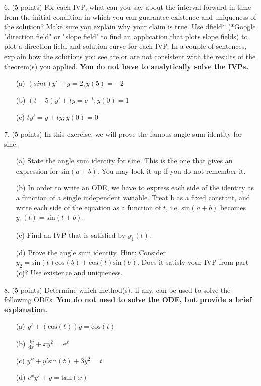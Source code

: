 \documentclass[12pt,letterpaper]{hmcpset}
\begin{document}
\begin{problem}
6. (5 points) For each IVP, what can you say about the interval forward in time from the initial
condition in which you can guarantee existence and uniqueness of the solution? Make sure
you explain why your claim is true. Use dfield* (*Google "direction field" or "slope field" to find an
application that plots slope fields)
to plot a direction field and solution curve for
each IVP. In a couple of sentences, explain how the solutions you see are or are not consistent
with the results of the theorem(s) you applied. \textbf{You do not have to analytically solve
the IVPs.}

\begin{enumerate}
    \item[(a)] $(sin t)y' + y = 2; y(5) = -2$
    \item[(b)]  $(t - 5)y' + ty = e^{-t}; y(0) = 1$
    \item[(c)] $ty' = y + ty; y(0) = 0$
\end{enumerate}
\end{problem}
\newpage

\begin{problem}
7. (5 points) In this exercise, we will prove the famous angle sum identity for sine.

\begin{enumerate}
    \item[(a)] State the angle sum identity for sine. This is the one that gives an expression for
$\text{sin}(a + b)$. You may look it up if you do not remember it.
    \item[(b)] In order to write an ODE, we have to express each side of the identity as a function of
a single independent variable. Treat b as a fixed constant, and write each side of the
equation as a function of $t$, i.e. sin$(a + b)$ becomes $y_1(t) = \text{sin}(t + b)$.
    \item[(c)] Find an IVP that is satisfied by $y_1(t)$.
    \item[(d)] Prove the angle sum identity. Hint: Consider $y_2 = \text{sin}(t) \text{cos} (b)+ \text{cos}(t)\text{sin}(b)$. Does it satisfy
your IVP from part (c)? Use existence and uniqueness.
\end{enumerate}
\end{problem}
\newpage

\begin{problem}
8. (5 points) Determine which method(s), if any, can be used to solve the following ODEs. \textbf{You
do not need to solve the ODE, but provide a brief explanation.}

\begin{enumerate}
    \item[(a)] $y' + (\text{cos}(t))y = \text{cos}(t)$
    \item[(b)] $\frac{\mathrm{d} y}{\mathrm{d} x} + xy^2 = e^x$
    \item[(c)]$y''+ y'\text{sin}(t) + 3y^2 = t$
    \item[(d)]$e^xy' + y = \text{tan}(x)$
\end{enumerate}
\end{problem}
\newpage

\end{document}
